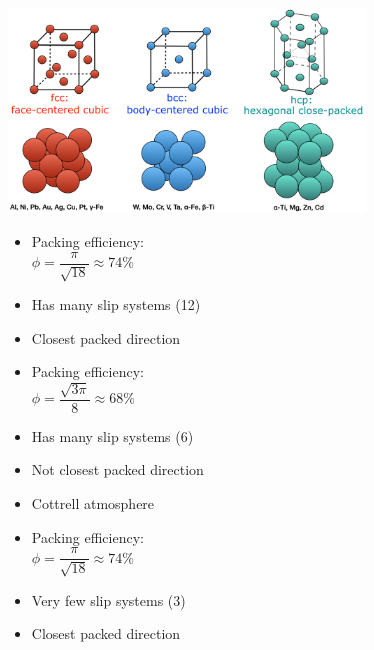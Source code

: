 \documentclass{article}
\begin{document}
\begin{center}
  \includegraphics[width=0.71\textwidth]{media/fccbcchcp.png}
\end{center}

\begin{minipage}[t]{0.33\textwidth}
  \begin{itemize}
    \item Packing efficiency:\\[0.1cm]
      $\phi = \dfrac{\pi}{\sqrt{18}} \approx 74\%$
    \item Has many slip systems (12)
    \item Closest packed direction
  \end{itemize}
\end{minipage}%
\begin{minipage}[t]{0.33\textwidth}
  \begin{itemize}
    \item Packing efficiency:\\[0.1cm]
      $\phi = \dfrac{\sqrt{3\pi}}{8} \approx 68\%$
    \item Has many slip systems (6)
    \item Not closest packed direction
    \item Cottrell atmosphere
  \end{itemize}
\end{minipage}%
\begin{minipage}[t]{0.33\textwidth}
  \vspace*{-0.45cm}
  \begin{itemize}
    \item Packing efficiency:\\[0.1cm]
      $\phi = \dfrac{\pi}{\sqrt{18}} \approx 74\%$
    \item Very few slip systems (3)
    \item Closest packed direction
  \end{itemize}
\end{minipage}
\end{document}
